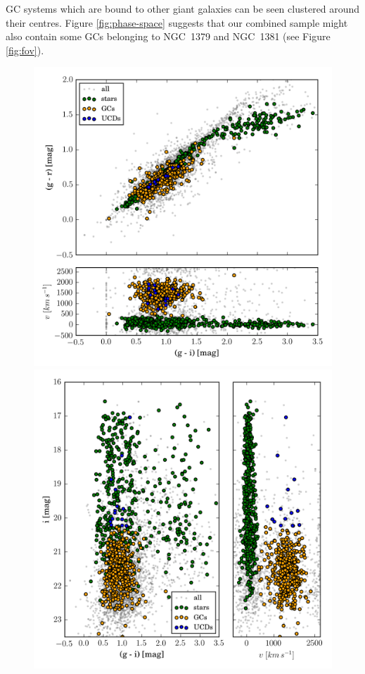 \documentclass[useAMS,usenatbib]{mn2e}
\begin{document}
GC systems which are bound to other giant galaxies can be seen clustered around 
their centres. Figure \ref{fig:phase-space} suggests that our combined sample 
might also contain some GCs belonging to NGC~1379 and NGC~1381 (see Figure 
\ref{fig:fov}). 

\begin{figure}
\centering
\includegraphics[width=\columnwidth]{figures/cc.png} 
\includegraphics[width=\columnwidth]{figures/cm.png} 

\end{figure}
\end{document}
